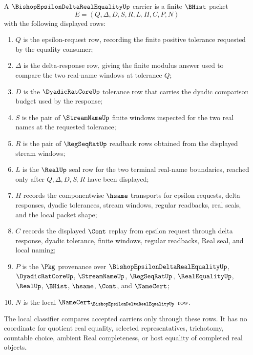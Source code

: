 \begin{definition}
\label{def:bishop-epsilon-delta-real-equality-carrier}
A $\BishopEpsilonDeltaRealEqualityUp$ carrier is a finite $\BHist$ packet
$$
E=(Q,\Delta,D,S,R,L,H,C,P,N)
$$
with the following displayed rows:
\begin{enumerate}
\item $Q$ is the epsilon-request row, recording the finite positive tolerance requested by the equality consumer;
\item $\Delta$ is the delta-response row, giving the finite modulus answer used to compare the two real-name windows at tolerance $Q$;
\item $D$ is the $\DyadicRatCoreUp$ tolerance row that carries the dyadic comparison budget used by the response;
\item $S$ is the pair of $\StreamNameUp$ finite windows inspected for the two real names at the requested tolerance;
\item $R$ is the pair of $\RegSeqRatUp$ readback rows obtained from the displayed stream windows;
\item $L$ is the $\RealUp$ seal row for the two terminal real-name boundaries, reached only after $Q,\Delta,D,S,R$ have been displayed;
\item $H$ records the componentwise $\hsame$ transports for epsilon requests, delta responses, dyadic tolerances, stream windows, regular readbacks, real seals, and the local packet shape;
\item $C$ records the displayed $\Cont$ replay from epsilon request through delta response, dyadic tolerance, finite windows, regular readbacks, Real seal, and local naming;
\item $P$ is the $\Pkg$ provenance over $\BishopEpsilonDeltaRealEqualityUp$, $\DyadicRatCoreUp$, $\StreamNameUp$, $\RegSeqRatUp$, $\RealEqualityUp$, $\RealUp$, $\BHist$, $\hsame$, $\Cont$, and $\NameCert$;
\item $N$ is the local $\NameCert_{\BishopEpsilonDeltaRealEqualityUp}$ row.
\end{enumerate}
The local classifier compares accepted carriers only through these rows. It has no coordinate for quotient real equality, selected representatives, trichotomy, countable choice, ambient Real completeness, or host equality of completed real objects.
\end{definition}


